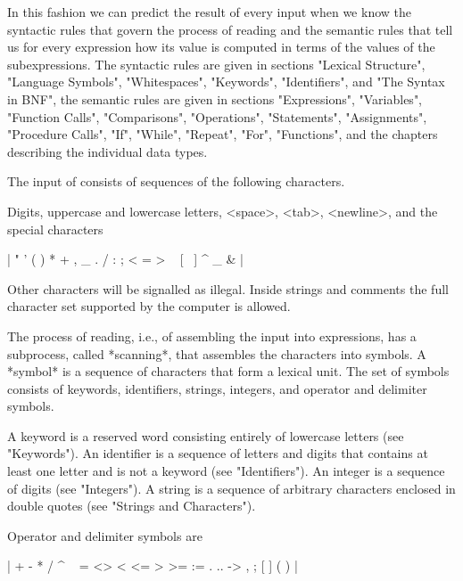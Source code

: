 In this fashion  we can predict the  result of every input  when we know
the syntactic rules that govern the  process of reading and the semantic
rules that  tell us for  every expression how  its value is  computed in
terms of the values of the subexpressions. The syntactic rules are given
in  sections  "Lexical  Structure", "Language  Symbols",  "Whitespaces",
"Keywords", "Identifiers", and  "The Syntax in BNF",  the semantic rules
are  given in  sections  "Expressions",  "Variables", "Function  Calls",
"Comparisons",  "Operations",  "Statements",  "Assignments",  "Procedure
Calls", "If",  "While", "Repeat",  "For", "Functions", and  the chapters
describing the individual data types.


The input of {\GAP} consists of sequences of the following characters.

Digits, uppercase and lowercase letters,  <space>, <tab>, <newline>,  and
the special characters

|    "       '       (       )       *       +       ,       _
    .       /       :       ;       <       =       >       ~
    [       \       ]       ^       _       {       }       & |

Other  characters  will  be signalled  as  illegal.   Inside strings  and
comments the full character set supported by the computer is allowed.


The  process of reading,  i.e., of assembling the input into expressions,
has a subprocess,  called  *scanning*, that assembles the characters into
symbols.   A *symbol*  is  a sequence of characters that form  a  lexical
unit.  The  set of  symbols  consists of  keywords, identifiers, strings,
integers, and operator and delimiter symbols.

A keyword is a  reserved word  consisting entirely  of lowercase  letters
(see "Keywords").  An identifier is a sequence of letters and digits that
contains at  least one letter  and is not a keyword  (see "Identifiers").
An integer is a  sequence of  digits  (see  "Integers").   A string is  a
sequence  of   arbitrary  characters   enclosed  in  double  quotes  (see
"Strings and Characters").

Operator and delimiter symbols are

|    +       -       *       /       ^       ~
    =       <>      <       <=      >       >=
    :=      .       ..      ->      ,       ;
    [       ]       {       }       (       )  |

